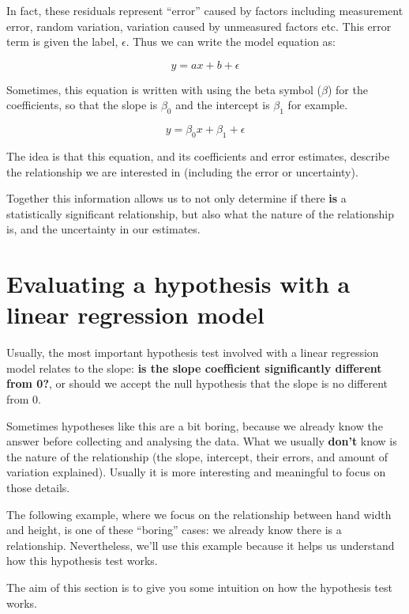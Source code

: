 \documentclass[
  a4paperpaper,
]{book}
\begin{document}
In fact, these residuals represent ``error'' caused by factors including measurement error, random variation, variation caused by unmeasured factors etc. This error term is given the label, \(\epsilon\). Thus we can write the model equation as:

\[y = ax+b+\epsilon\]

Sometimes, this equation is written with using the beta symbol (\(\beta\)) for the coefficients, so that the slope is \(\beta_0\) and the intercept is \(\beta_1\) for example.

\[y = \beta_0 x+\beta_1+\epsilon\]

The idea is that this equation, and its coefficients and error estimates, describe the relationship we are interested in (including the error or uncertainty).

Together this information allows us to not only determine if there \textbf{is} a statistically significant relationship, but also what the nature of the relationship is, and the uncertainty in our estimates.

\hypertarget{evaluating-a-hypothesis-with-a-linear-regression-model}{%
\section{Evaluating a hypothesis with a linear regression model}\label{evaluating-a-hypothesis-with-a-linear-regression-model}}

Usually, the most important hypothesis test involved with a linear regression model relates to the slope: \textbf{is the slope coefficient significantly different from 0?}, or should we accept the null hypothesis that the slope is no different from 0.

Sometimes hypotheses like this are a bit boring, because we already know the answer before collecting and analysing the data. What we usually \textbf{don't} know is the nature of the relationship (the slope, intercept, their errors, and amount of variation explained). Usually it is more interesting and meaningful to focus on those details.

The following example, where we focus on the relationship between hand width and height, is one of these ``boring'' cases: we already know there is a relationship. Nevertheless, we'll use this example because it helps us understand how this hypothesis test works.

The aim of this section is to give you some intuition on how the hypothesis test works.
\end{document}
